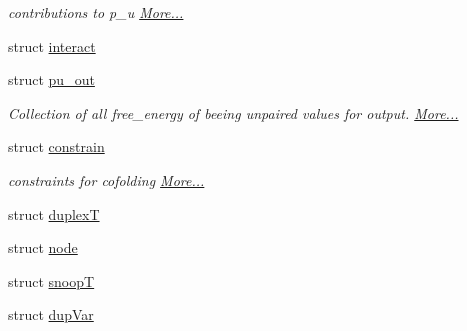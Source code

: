 \begin{DoxyCompactItemize}
\begin{DoxyCompactList}\small\item\em contributions to p\+\_\+u  \hyperlink{group__data__structures_structpu__contrib}{More...}\end{DoxyCompactList}\item 
struct \hyperlink{group__data__structures_structinteract}{interact}
\item 
struct \hyperlink{group__data__structures_structpu__out}{pu\+\_\+out}
\begin{DoxyCompactList}\small\item\em Collection of all free\+\_\+energy of beeing unpaired values for output.  \hyperlink{group__data__structures_structpu__out}{More...}\end{DoxyCompactList}\item 
struct \hyperlink{group__data__structures_structconstrain}{constrain}
\begin{DoxyCompactList}\small\item\em constraints for cofolding  \hyperlink{group__data__structures_structconstrain}{More...}\end{DoxyCompactList}\item 
struct \hyperlink{group__data__structures_structduplexT}{duplex\+T}
\item 
struct \hyperlink{group__data__structures_structnode}{node}
\item 
struct \hyperlink{group__data__structures_structsnoopT}{snoop\+T}
\item 
struct \hyperlink{group__data__structures_structdupVar}{dup\+Var}
\end{DoxyCompactItemize}
